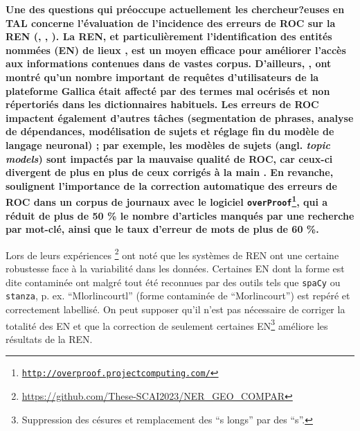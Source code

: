 \textbf{Une des questions qui préoccupe actuellement les chercheur?euses en TAL concerne l’évaluation de l’incidence des erreurs de ROC sur la REN (\cite{chiron:hal-03025508}, \cite{hamdi:hal-03026931}, \cite{DBLP:journals/corr/abs-2302-10204}). %
La REN, et particulièrement l’identification des entités nommées (EN) de lieux \cite{vanStrien-2020}, est un moyen efficace pour améliorer l’accès aux informations contenues dans de vastes corpus.
D'ailleurs, \cite{chiron:hal-03025508}, ont montré qu'un nombre important de requêtes d'utilisateurs de la plateforme Gallica était affecté par des termes mal océrisés et non répertoriés dans les dictionnaires habituels. 
Les erreurs de ROC impactent également d'autres tâches (segmentation de phrases, analyse de dépendances, modélisation de sujets et réglage fin du modèle de langage neuronal) ; par exemple, les \og{}modèles de sujets\fg{} (angl. \textit{topic models}) sont impactés par la mauvaise qualité de ROC, car ceux-ci divergent de plus en plus de ceux corrigés à la main \cite{vanStrien-2020}.
En revanche, \cite{evershed2014correcting} soulignent l'importance de la correction automatique des erreurs de ROC dans un corpus de journaux avec le logiciel \texttt{overProof\footnote{\url{http://overproof.projectcomputing.com/}}}, qui a réduit de plus de 50 \% le nombre d'articles manqués par une recherche par mot-clé, ainsi que le taux d'erreur de mots de plus de 60 \%.}

Lors de leurs expériences \cite{DBLP:conf/gis/Koudoro-Parfait21}\footnote{\url{https://github.com/These-SCAI2023/NER_GEO_COMPAR}} 
ont noté que les systèmes de REN ont une certaine robustesse face à la variabilité dans les données. Certaines EN dont la forme est dite \og{}contaminée\fg{} \cite{hamdi:hal-03615997} ont malgré tout été reconnues par des outils tels que \texttt{spaCy} ou \texttt{stanza}, p. ex. “Mlorlincourtl” (forme contaminée de “Morlincourt”)  est repéré et correctement labellisé. On peut supposer qu'il n'est pas nécessaire de corriger la totalité des EN et que la correction de seulement certaines EN\footnote{Suppression des césures et remplacement des ``s longs'' par des ``s''.} \cite{DBLP:conf/konvens/AlexGKT12} améliore les résultats de la REN. 

